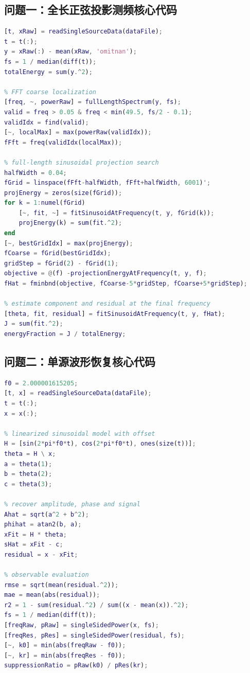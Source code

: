 \documentclass[UTF8,a4paper,12pt]{ctexart}
\numberwithin{figure}{section}
\numberwithin{table}{section}
\begin{document}
\subsection{问题一：全长正弦投影测频核心代码}
\begin{lstlisting}[language=Matlab]
% read data and remove DC component
[t, xRaw] = readSingleSourceData(dataFile);
t = t(:);
y = xRaw(:) - mean(xRaw, 'omitnan');
fs = 1 / median(diff(t));
totalEnergy = sum(y.^2);

% FFT coarse localization
[freq, ~, powerRaw] = fullLengthSpectrum(y, fs);
valid = freq > 0.05 & freq < min(49.5, fs/2 - 0.1);
validIdx = find(valid);
[~, localMax] = max(powerRaw(validIdx));
fFft = freq(validIdx(localMax));

% full-length sinusoidal projection search
halfWidth = 0.04;
fGrid = linspace(fFft-halfWidth, fFft+halfWidth, 6001)';
projEnergy = zeros(size(fGrid));
for k = 1:numel(fGrid)
    [~, fit, ~] = fitSinusoidAtFrequency(t, y, fGrid(k));
    projEnergy(k) = sum(fit.^2);
end
[~, bestGridIdx] = max(projEnergy);
fCoarse = fGrid(bestGridIdx);
gridStep = fGrid(2) - fGrid(1);
objective = @(f) -projectionEnergyAtFrequency(t, y, f);
fHat = fminbnd(objective, fCoarse-5*gridStep, fCoarse+5*gridStep);

% estimate component and residual at the final frequency
[theta, fit, residual] = fitSinusoidAtFrequency(t, y, fHat);
J = sum(fit.^2);
energyFraction = J / totalEnergy;
\end{lstlisting}

\subsection{问题二：单源波形恢复核心代码}
\begin{lstlisting}[language=Matlab]
% f0 is obtained from Question 1
f0 = 2.000001615205;
[t, x] = readSingleSourceData(dataFile);
t = t(:);
x = x(:);

% linearized sinusoidal model with offset
H = [sin(2*pi*f0*t), cos(2*pi*f0*t), ones(size(t))];
theta = H \ x;
a = theta(1);
b = theta(2);
c = theta(3);

% recover amplitude, phase and signal
Ahat = sqrt(a^2 + b^2);
phihat = atan2(b, a);
xFit = H * theta;
sHat = xFit - c;
residual = x - xFit;

% observable evaluation
rmse = sqrt(mean(residual.^2));
mae = mean(abs(residual));
r2 = 1 - sum(residual.^2) / sum((x - mean(x)).^2);
fs = 1 / median(diff(t));
[freqRaw, pRaw] = singleSidedPower(x, fs);
[freqRes, pRes] = singleSidedPower(residual, fs);
[~, k0] = min(abs(freqRaw - f0));
[~, kr] = min(abs(freqRes - f0));
suppressionRatio = pRaw(k0) / pRes(kr);
\end{lstlisting}
\end{document}
